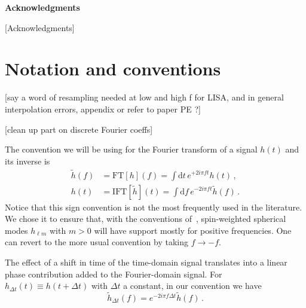 \documentclass[aps,showpacs,twocolumn,
prd,superscriptaddress,nofootinbib]{revtex4-1}
\newcommand{\be}{\begin{equation}}
\newcommand{\ee}{\end{equation}}
\newcommand\ud{{\mathrm{d}}}
\newcommand{\SM}[1]{{\color{Red} #1}}
\begin{document}

\vspace{4.5mm}

\hspace{0.85in}
{\bf Acknowledgments}

\vspace{3.5mm}

[Acknowledgments]


\appendix

\section{Notation and conventions}
\label{app:notation}

\SM{[say a word of resampling needed at low and high f for LISA, and in general interpolation errors, appendix or refer to paper PE ?]}

\SM{[clean up part on discrete Fourier coeffs]}

The convention we will be using for the Fourier transform of a signal $h(t)$ and its inverse is
\begin{subequations}
\label{eq:defFT}
\begin{align}
	\tilde{h}(f) &= \mathrm{FT}[h](f) =  \int \ud t \, e^{+2i\pi f t} h(t) \,, \\
	h(t) &= \mathrm{IFT}[\tilde{h}](t) =  \int \ud f \, e^{-2i\pi f t} \tilde{h}(f) \,.
\end{align}
\end{subequations}
Notice that this sign convention is not the most frequently used in the literature. We chose it to ensure that, with the conventions of~\cite{BlanchetLiving}, spin-weighted spherical modes $h_{\ell m}$ with $m>0$ will have support mostly for positive frequencies. One can revert to the more usual convention by taking $f\rightarrow -f$.

The effect of a shift in time of the time-domain signal translates into a linear phase contribution added to the Fourier-domain signal. For $h_{\Delta t}(t) \equiv h(t+\Delta t)$ with $\Delta t$ a constant, in our convention we have
\be\label{eq:shifttime}
	\tilde{h}_{\Delta t} (f) = e^{-2i\pi f \Delta t} \tilde{h}(f) \,.
\ee
\end{document}
